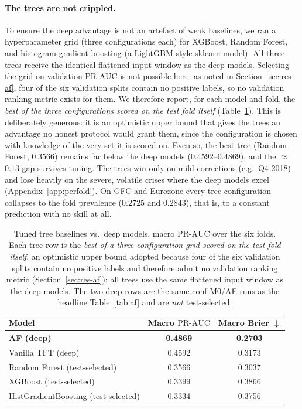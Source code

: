 \documentclass[11pt,a4paper]{article}
\newcommand{\prauc}{\mbox{PR-AUC}}
\begin{document}
\paragraph{The trees are not crippled.} To ensure the deep advantage is not an
artefact of weak baselines, we ran a hyperparameter grid (three configurations
each) for XGBoost, Random Forest, and histogram gradient boosting (a
LightGBM-style sklearn model). All three trees receive the identical flattened
input window as the deep models. Selecting the grid on validation PR-AUC is not
possible here: as noted in Section~\ref{sec:res-af}, four of the six validation
splits contain no positive labels, so no validation ranking metric exists for
them. We therefore report, for each model and fold, the \emph{best of the three
configurations scored on the test fold itself} (Table~\ref{tab:trees}). This is
deliberately generous: it is an optimistic upper bound that gives the trees an
advantage no honest protocol would grant them, since the configuration is
chosen with knowledge of the very set it is scored on. Even so, the best tree
(Random Forest, $0.3566$) remains far below the deep models
($0.4592$--$0.4869$), and the $\approx$$0.13$ gap survives tuning. The trees
win only on mild corrections (e.g.\ Q4-2018) and lose heavily on the severe,
volatile crises where the deep models excel (Appendix~\ref{app:perfold}). On
GFC and Eurozone every tree configuration collapses to the fold prevalence
($0.2725$ and $0.2843$), that is, to a constant prediction with no skill at
all.

\begin{table}[h]
\centering\small
\caption{Tuned tree baselines vs.\ deep models, macro $\prauc$ over the six
folds. Each tree row is the \emph{best of a three-configuration grid scored on
the test fold itself}, an optimistic upper bound adopted because four of the
six validation splits contain no positive labels and therefore admit no
validation ranking metric (Section~\ref{sec:res-af}); all trees use the same
flattened input window as the deep models. The two deep rows are the same
conf-M0/AF runs as the headline Table~\ref{tab:af} and are \emph{not}
test-selected.}
\label{tab:trees}
\begin{tabular}{lcc}
\toprule
Model & Macro $\prauc$ & Macro Brier $\downarrow$ \\
\midrule
\textbf{AF (deep)}        & \textbf{0.4869} & \textbf{0.2703} \\
Vanilla TFT (deep)        & 0.4592 & 0.3173 \\
Random Forest (test-selected)     & 0.3566 & 0.3037 \\
XGBoost (test-selected)           & 0.3399 & 0.3866 \\
HistGradientBoosting (test-selected) & 0.3334 & 0.3756 \\
\bottomrule
\end{tabular}
\end{table}
\end{document}

